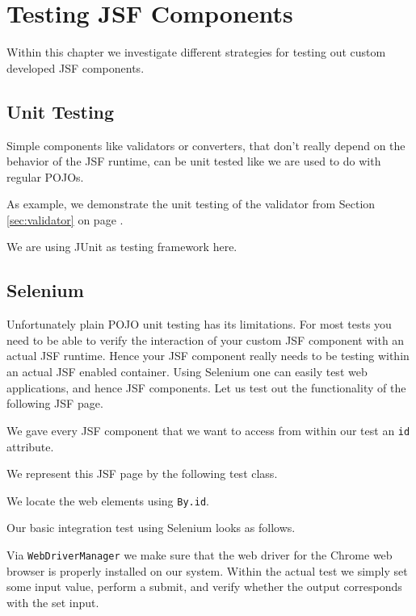 %

\chapter{Testing JSF Components}
Within this chapter we investigate different strategies for testing out custom developed JSF components.

\section{Unit Testing}
Simple components like validators or converters, that don't really depend on the behavior of the JSF runtime, can be unit tested like we are used to do with regular POJOs.

As example, we demonstrate the unit testing of the validator from Section \ref{sec:validator}  on page \pageref{sec:validator}.

We are using JUnit \cite{junit5} as testing framework here.


\section{Selenium}
Unfortunately plain POJO unit testing has its limitations.
For most tests you  need to be able to verify the interaction of your custom JSF component with an actual JSF runtime.
Hence your JSF component really needs to be testing within an actual JSF enabled container.
Using Selenium \cite{selenium} one can easily test web applications, and hence JSF components.
Let us test out the functionality of the following JSF page.

We gave every JSF component that we want to access from within our test an \texttt{id} attribute.

We represent this JSF page by the following test class.

We locate the web elements using \texttt{By.id}.

Our basic integration test using Selenium looks as follows.

Via \texttt{WebDriverManager} we make sure that the web driver \cite{webdriver} for the Chrome web browser is properly installed on our system.
Within the actual test we simply set some input value, perform a submit, and verify whether the output corresponds with the set input.

